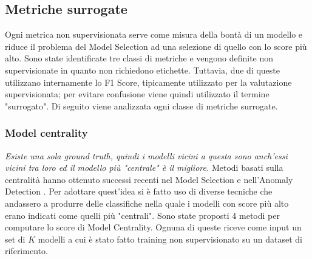 \subsection{Metriche surrogate}
Ogni metrica non supervisionata serve come misura della bontà di un modello e riduce il problema del Model Selection ad una selezione di quello con lo score più alto. 
Sono state identificate tre classi di metriche e vengono definite non supervisionate in quanto non richiedono etichette. Tuttavia, due di queste utilizzano internamente lo F1 Score, tipicamente utilizzato per la valutazione supervisionata; per evitare confusione viene quindi utilizzato il termine "surrogato".
Di seguito viene analizzata ogni classe di metriche surrogate. 


\subsubsection{Model centrality}
\textit{Esiste una sola ground truth, quindi i modelli vicini a questa sono anch'essi vicini tra loro ed il modello più "centrale" è il migliore.}
Metodi basati sulla centralità hanno ottenuto successi recenti nel Model Selection e nell'Anomaly Detection \cite{DBLP:journals/corr/abs-2104-01422}. 
Per adottare quest'idea si è fatto uso di diverse tecniche che andassero a produrre delle classifiche nella quale i modelli con score più alto erano indicati come quelli più "centrali".
Sono state proposti 4 metodi per computare lo score di Model Centrality. Ognuna di queste riceve come input un set di $K$ modelli a cui è stato fatto training non supervisionato su un dataset di riferimento. 
